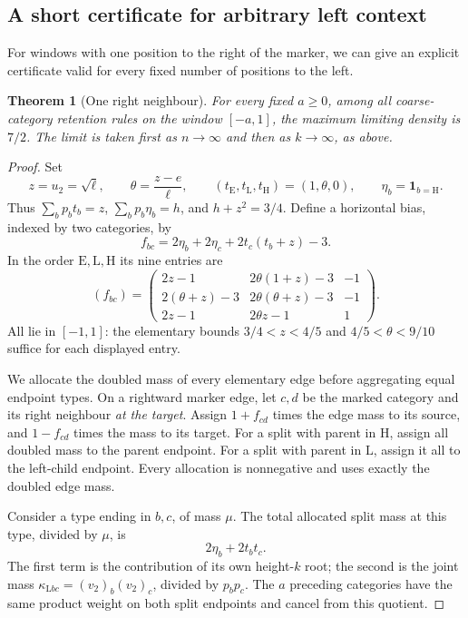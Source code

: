 \documentclass[11pt,a4paper]{article}
\newtheorem{theorem}{Theorem}[section]
\theoremstyle{definition}
\theoremstyle{remark}
\newcommand{\E}{\mathrm E}
\newcommand{\HH}{\mathrm H}
\newcommand{\LL}{\mathrm L}
\newcommand{\ind}{\mathbf1}
\begin{document}
\subsection{A short certificate for arbitrary left context}
For windows with one position to the right of the marker, we can give an explicit certificate valid for every fixed number of positions to the left.
\begin{theorem}[One right neighbour]\label{thm:one-right}
For every fixed $a\ge0$, among all coarse-category retention rules on the window $[-a,1]$, the maximum limiting density is $7/2$. The limit is taken first as $n\to\infty$ and then as $k\to\infty$, as above.
\end{theorem}
\begin{proof}
Set
\[
z=u_2=\sqrt\ell,\qquad \theta=\frac{z-e}{\ell},\qquad
(t_\E,t_\LL,t_\HH)=(1,\theta,0),\qquad \eta_b=\ind_{b=\HH}.
\]
Thus $\sum_b p_bt_b=z$, $\sum_b p_b\eta_b=h$, and $h+z^2=3/4$.
Define a horizontal bias, indexed by two categories, by
\begin{equation}\label{eq:onebias}
f_{bc}=2\eta_b+2\eta_c+2t_c(t_b+z)-3.
\end{equation}
In the order $\E,\LL,\HH$ its nine entries are
\begin{equation}\label{eq:biasmatrix}
(f_{bc})=
\begin{pmatrix}
2z-1&2\theta(1+z)-3&-1\\
2(\theta+z)-3&2\theta(\theta+z)-3&-1\\
2z-1&2\theta z-1&1
\end{pmatrix}.
\end{equation}
All lie in $[-1,1]$: the elementary bounds $3/4<z<4/5$ and $4/5<\theta<9/10$ suffice for each displayed entry.

We allocate the doubled mass of every elementary edge before aggregating equal endpoint types. On a rightward marker edge, let $c,d$ be the marked category and its right neighbour \emph{at the target}. Assign $1+f_{cd}$ times the edge mass to its source, and $1-f_{cd}$ times the mass to its target. For a split with parent in $\HH$, assign all doubled mass to the parent endpoint. For a split with parent in $\LL$, assign it all to the left-child endpoint. Every allocation is nonnegative and uses exactly the doubled edge mass.

Consider a type ending in $b,c$, of mass $\mu$. The total allocated split mass at this type, divided by $\mu$, is
\[
2\eta_b+2t_bt_c.
\]
The first term is the contribution of its own height-$k$ root; the second is the joint mass $\kappa_{\LL bc}=(v_2)_b(v_2)_c$, divided by $p_bp_c$. The $a$ preceding categories have the same product weight on both split endpoints and cancel from this quotient.


\end{proof}
\end{document}
